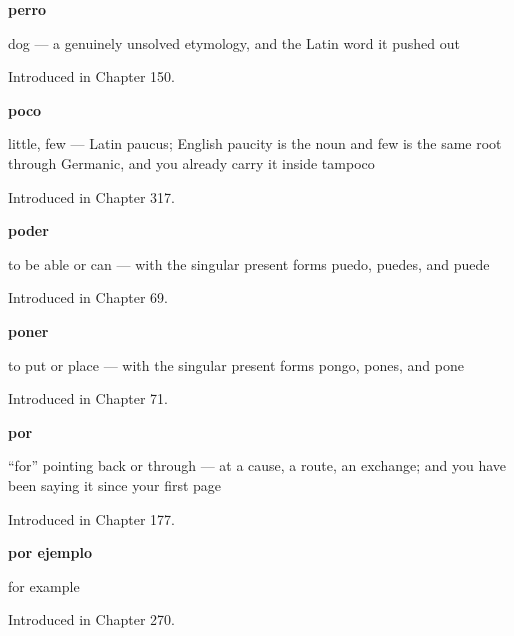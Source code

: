 \noindent\begin{minipage}[t]{\linewidth}
\raggedright
\textbf{perro}\par
\small dog — a genuinely unsolved etymology, and the Latin word it pushed out\par
\footnotesize Introduced in Chapter 150.
\end{minipage}\par\medskip

\noindent\begin{minipage}[t]{\linewidth}
\raggedright
\textbf{poco}\par
\small little, few — Latin paucus; English paucity is the noun and few is the same root through Germanic, and you already carry it inside tampoco\par
\footnotesize Introduced in Chapter 317.
\end{minipage}\par\medskip

\noindent\begin{minipage}[t]{\linewidth}
\raggedright
\textbf{poder}\par
\small to be able or can — with the singular present forms puedo, puedes, and puede\par
\footnotesize Introduced in Chapter 69.
\end{minipage}\par\medskip

\noindent\begin{minipage}[t]{\linewidth}
\raggedright
\textbf{poner}\par
\small to put or place — with the singular present forms pongo, pones, and pone\par
\footnotesize Introduced in Chapter 71.
\end{minipage}\par\medskip

\noindent\begin{minipage}[t]{\linewidth}
\raggedright
\textbf{por}\par
\small \textquotedblleft{}for\textquotedblright{} pointing back or through — at a cause, a route, an exchange; and you have been saying it since your first page\par
\footnotesize Introduced in Chapter 177.
\end{minipage}\par\medskip

\noindent\begin{minipage}[t]{\linewidth}
\raggedright
\textbf{por ejemplo}\par
\small for example\par
\footnotesize Introduced in Chapter 270.
\end{minipage}\par\medskip

